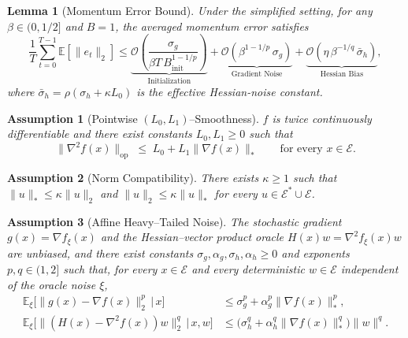 \documentclass[10pt,a4paper]{amsart}
\newtheorem{lemma}{Lemma}
\newtheorem{assumption}{Assumption}
\begin{document}
\begin{lemma}[Momentum Error Bound]
\label{lemma:main_error}
Under the simplified setting, for any $\beta \in (0, 1/2]$ and $B = 1$,
the averaged momentum error satisfies
\begin{equation}
\label{eq:main_error}
    \frac{1}{T}\sum_{t=0}^{T-1}\mathbb{E}[\|e_t\|_2]
    \le \underbrace{\mathcal{O}\!\left(\frac{\sigma_g}{\beta T\, B_{\mathrm{init}}^{1-1/p}}\right)}_{\text{Initialization}}
    + \underbrace{\mathcal{O}\!\left(\beta^{1-1/p}\,\sigma_g\right)}_{\text{Gradient Noise}}
    + \underbrace{\mathcal{O}\!\left(\eta\,\beta^{-1/q}\,\bar\sigma_h\right)}_{\text{Hessian Bias}},
\end{equation}
where $\bar\sigma_h = \rho(\sigma_h + \kappa L_0)$ is the effective
Hessian-noise constant.
\end{lemma}

\begin{assumption}[Pointwise $(L_0, L_1)$--Smoothness]
\label{ass:app:smooth}
$f$ is twice continuously differentiable and there exist constants
$L_0, L_1 \geq 0$ such that
\begin{equation}
  \|\nabla^2 f(x)\|_{\mathrm{op}}
  \;\leq\; L_0 + L_1 \|\nabla f(x)\|_*
  \qquad \text{for every } x \in \mathcal{E}.
  \label{eq:app:L0L1}
\end{equation}
\end{assumption}

\begin{assumption}[Norm Compatibility]
\label{ass:app:kappa}
There exists $\kappa \geq 1$ such that $\|u\|_* \leq \kappa \|u\|_2$ and
$\|u\|_2 \leq \kappa \|u\|_*$ for every $u \in \mathcal{E}^* \cup
\mathcal{E}$.
\end{assumption}

\begin{assumption}[Affine Heavy--Tailed Noise]
\label{ass:app:noise}
The stochastic gradient $g(x) = \nabla f_\xi(x)$ and the Hessian--vector
product oracle $H(x)w = \nabla^2 f_\xi(x) w$ are unbiased, and there
exist constants $\sigma_g, \alpha_g, \sigma_h, \alpha_h \geq 0$ and
exponents $p, q \in (1, 2]$ such that, for every $x \in \mathcal{E}$ and
every deterministic $w \in \mathcal{E}$ independent of the oracle noise
$\xi$,
\begin{align}
  \mathbb{E}_\xi\bigl[\|g(x) - \nabla f(x)\|_2^p \,\big|\, x\bigr]
    &\leq \sigma_g^p + \alpha_g^p \|\nabla f(x)\|_*^p,
  \label{eq:app:noise-g} \\
  \mathbb{E}_\xi\bigl[\|(H(x) - \nabla^2 f(x))w\|_2^q \,\big|\, x, w\bigr]
    &\leq \bigl(\sigma_h^q + \alpha_h^q \|\nabla f(x)\|_*^q\bigr) \|w\|^q.
  \label{eq:app:noise-h}
\end{align}
\end{assumption}
\end{document}
